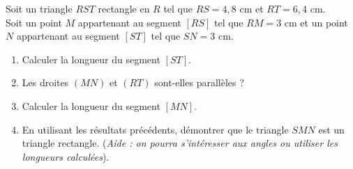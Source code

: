 \documentclass[a4paper]{book}
\begin{document}
    
    \begin{exercice}
        Soit un triangle $RST$ rectangle en $R$ tel que $RS = 4,8$ cm et $RT = 6,4$ cm. \\
        Soit un point $M$ appartenant au segment $[RS]$ tel que $RM = 3$ cm et un point $N$ appartenant au segment $[ST]$ tel que $SN = 3$ cm.
        
        \begin{enumerate}
            \item Calculer la longueur du segment $[ST]$.
            \item Les droites $(MN)$ et $(RT)$ sont-elles parallèles ?
            \item Calculer la longueur du segment $[MN]$.
            \item En utilisant les résultats précédents, démontrer que le triangle $SMN$ est un triangle rectangle. (\textit{Aide : on pourra s'intéresser aux angles ou utiliser les longueurs calculées}).
        \end{enumerate}
    \end{exercice}
\end{document}
